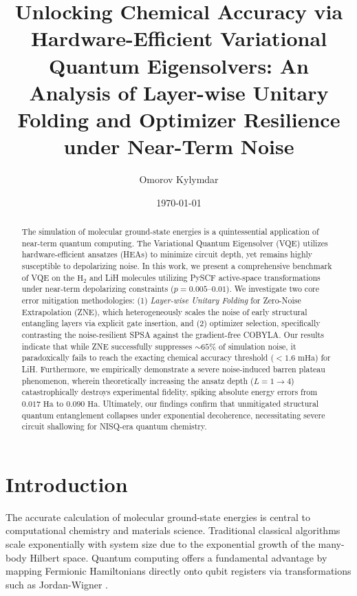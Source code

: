\documentclass[aps,prx,reprint,superscriptaddress,nofootinbib,amsmath,amssymb]{revtex4-2}
\begin{document}
\title{Unlocking Chemical Accuracy via Hardware-Efficient Variational Quantum Eigensolvers: An Analysis of Layer-wise Unitary Folding and Optimizer Resilience under Near-Term Noise}

\author{Omorov Kylymdar}

\date{\today}

\begin{abstract}
The simulation of molecular ground-state energies is a quintessential application of near-term quantum computing. The Variational Quantum Eigensolver (VQE) utilizes hardware-efficient ansatzes (HEAs) to minimize circuit depth, yet remains highly susceptible to depolarizing noise. In this work, we present a comprehensive benchmark of VQE on the \(\text{H}_2\) and LiH molecules utilizing PySCF active-space transformations under near-term depolarizing constraints (\(p = 0.005\text{--}0.01\)). We investigate two core error mitigation methodologies: (1) \emph{Layer-wise Unitary Folding} for Zero-Noise Extrapolation (ZNE), which heterogeneously scales the noise of early structural entangling layers via explicit gate insertion, and (2) optimizer selection, specifically contrasting the noise-resilient SPSA against the gradient-free COBYLA. Our results indicate that while ZNE successfully suppresses \(\sim 65\%\) of simulation noise, it paradoxically fails to reach the exacting chemical accuracy threshold (\(< 1.6 \text{ mHa}\)) for LiH. Furthermore, we empirically demonstrate a severe noise-induced barren plateau phenomenon, wherein theoretically increasing the ansatz depth (\(L=1 \to 4\)) catastrophically destroys experimental fidelity, spiking absolute energy errors from \(0.017 \text{ Ha}\) to \(0.090 \text{ Ha}\). Ultimately, our findings confirm that unmitigated structural quantum entanglement collapses under exponential decoherence, necessitating severe circuit shallowing for NISQ-era quantum chemistry.
\end{abstract}

\maketitle

\section{Introduction}

The accurate calculation of molecular ground-state energies is central to computational chemistry and materials science. Traditional classical algorithms scale exponentially with system size due to the exponential growth of the many-body Hilbert space. Quantum computing offers a fundamental advantage by mapping Fermionic Hamiltonians directly onto qubit registers via transformations such as Jordan-Wigner \cite{kandala2017hardware}. 
\end{document}
